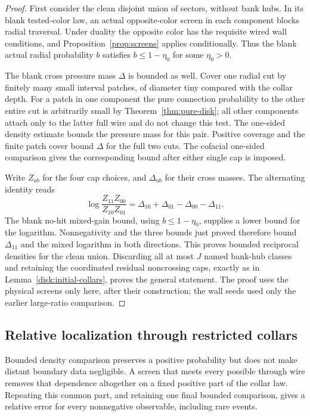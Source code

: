 \begin{proof}
First consider the clean disjoint union of sectors, without bank
hubs. In its blank tested-color law, an actual opposite-color screen
in each component blocks radial traversal. Under duality the opposite
color has the requisite wired wall conditions, and
Proposition~\ref{prop:screens} applies conditionally. Thus the blank
actual radial probability $b$ satisfies $b\le1-\eta_0$ for some
$\eta_0>0$.

The blank cross pressure mass $\Delta$ is bounded as well. Cover one
radial cut by finitely many small interval patches, of diameter tiny
compared with the collar depth. For a patch in one component the
pure connection probability to the other entire cut is arbitrarily
small by Theorem~\ref{thm:pure-disk}; all other components attach
only to the latter full wire and do not change this test. The
one-sided density estimate bounds the pressure mass for this pair.
Positive coverage and the finite patch cover bound $\Delta$ for
the full two cuts. The cofacial one-sided comparison gives the
corresponding bound after either single cap is imposed.

Write $Z_{ab}$ for the four cap choices, and $\Delta_{ab}$ for
their cross masses. The alternating identity reads
\[
 \log\frac{Z_{11}Z_{00}}{Z_{10}Z_{01}}
       =\Delta_{10}+\Delta_{01}-\Delta_{00}-\Delta_{11}.
\]
The blank no-hit mixed-gain bound, using $b\le1-\eta_0$, supplies
a lower bound for the logarithm. Nonnegativity and the three bounds
just proved therefore bound $\Delta_{11}$ and the mixed logarithm
in both directions. This proves bounded reciprocal densities for
the clean union. Discarding all at most $J$ named bank-hub
classes and retaining the coordinated residual noncrossing caps,
exactly as in Lemma~\ref{disk:initial-collars}, proves the general
statement. The proof uses the physical screens only here, after
their construction; the wall seeds used only the earlier large-ratio
comparison.
\end{proof}

\subsection{Relative localization through restricted collars}

Bounded density comparison preserves a positive probability but does
not make distant boundary data negligible. A screen that meets every
possible through wire removes that dependence altogether on a fixed
positive part of the collar law. Repeating this common part, and
retaining one final bounded comparison, gives a relative error for
every nonnegative observable, including rare events.

